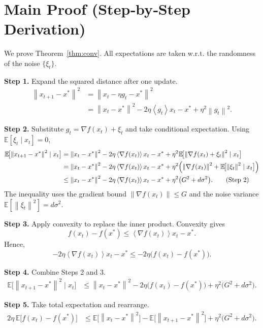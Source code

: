 \documentclass[11pt]{article}
\newcommand{\E}{\mathbb{E}}
\newcommand{\norm}[1]{\left\lVert #1 \right\rVert}
\newcommand{\inner}[1]{\left\langle #1 \right\rangle}
\begin{document}
\section*{Main Proof (Step‑by‑Step Derivation)}
We prove Theorem~\ref{thm:conv}.  
All expectations are taken w.r.t. the randomness of the noise $\{\xi_{t}\}$.

\noindent\textbf{Step 1.} Expand the squared distance after one update.
\begin{align}
\norm{x_{t+1}-x^{*}}^{2}
&= \norm{x_{t}-\eta g_{t}-x^{*}}^{2} \nonumber\\
&= \norm{x_{t}-x^{*}}^{2}
-2\eta\inner{g_{t}}{x_{t}-x^{*}}
+\eta^{2}\norm{g_{t}}^{2}. \tag{Step 1}
\end{align}

\noindent\textbf{Step 2.} Substitute $g_{t}= \nabla f(x_{t})+\xi_{t}$ and take conditional expectation.
Using $\E[\xi_{t}\mid x_{t}]=0$,
\begin{align}
\E\!\bigl[\norm{x_{t+1}-x^{*}}^{2}\mid x_{t}\bigr]
&= \norm{x_{t}-x^{*}}^{2}
-2\eta\inner{\nabla f(x_{t})}{x_{t}-x^{*}}
+\eta^{2}\E\!\bigl[\norm{\nabla f(x_{t})+\xi_{t}}^{2}\mid x_{t}\bigr] \nonumber\\
&= \norm{x_{t}-x^{*}}^{2}
-2\eta\inner{\nabla f(x_{t})}{x_{t}-x^{*}}
+\eta^{2}\Bigl(\norm{\nabla f(x_{t})}^{2}
+\E\!\bigl[\norm{\xi_{t}}^{2}\mid x_{t}\bigr]\Bigr) \nonumber\\
&\le 
\norm{x_{t}-x^{*}}^{2}
-2\eta\inner{\nabla f(x_{t})}{x_{t}-x^{*}}
+\eta^{2}\bigl(G^{2}+d\sigma^{2}\bigr). \tag{Step 2}
\end{align}
The inequality uses the gradient bound $\norm{\nabla f(x_{t})}\le G$ and the noise variance
$\E[\norm{\xi_{t}}^{2}]=d\sigma^{2}$.

\noindent\textbf{Step 3.} Apply convexity to replace the inner product.
Convexity gives
\[
f(x_{t})-f(x^{*})\le \inner{\nabla f(x_{t})}{x_{t}-x^{*}}.
\]
Hence,
\[
-2\eta\inner{\nabla f(x_{t})}{x_{t}-x^{*}}
\le -2\eta\bigl(f(x_{t})-f(x^{*})\bigr). \tag{Step 3}
\]

\noindent\textbf{Step 4.} Combine Steps 2 and 3.
\begin{align}
\E\!\bigl[\norm{x_{t+1}-x^{*}}^{2}\mid x_{t}\bigr]
&\le 
\norm{x_{t}-x^{*}}^{2}
-2\eta\bigl(f(x_{t})-f(x^{*})\bigr)
+\eta^{2}\bigl(G^{2}+d\sigma^{2}\bigr). \tag{Step 4}
\end{align}

\noindent\textbf{Step 5.} Take total expectation and rearrange.
\begin{align}
2\eta\,\E\!\bigl[f(x_{t})-f(x^{*})\bigr]
&\le 
\E\!\bigl[\norm{x_{t}-x^{*}}^{2}\bigr]
-\E\!\bigl[\norm{x_{t+1}-x^{*}}^{2}\bigr]
+\eta^{2}\bigl(G^{2}+d\sigma^{2}\bigr). \tag{Step 5}
\end{align}
\end{document}
